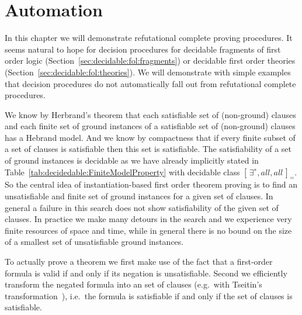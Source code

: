 
\chapter{Automation}



In this chapter we will demonstrate refutational complete proving procedures.
It seems natural to hope for decision procedures
for decidable fragments of first order logic
(Section~\ref{sec:decidable:fol:fragments})
or decidable first order theories (Section~\ref{sec:decidable:fol:theories}).
We will demonstrate with simple examples that decision procedures do not automatically
fall out from refutational complete procedures.


%
We know by Herbrand's theorem
that each satisfiable set of (non-ground) clauses
and each finite set of ground instances of a satisfiable set of (non-ground) clauses
has a Hebrand model.
And we know by compactness
that if every finite subset of a set of clauses is satisfiable then this set is satisfiable.
The satisfiability of a set of ground instances is decidable
as we have already implicitly stated in Table~\vref{tab:decidedable:FiniteModelProperty}
with decidable class \({[\,\exists^{∗}, all, all\,]}_{=}\).
So the central idea of instantiation-based first order theorem proving
is to find an unsatisfiable and finite set of ground instances for a given set of clauses.
In general a failure in this search does not show satisfiability of the given set of clauses.
In practice we make many detours in the search and we experience very finite resources of space and time,
while in general there is no bound on the size of a smallest set of unsatisfiable ground instances.



To actually prove a theorem
we first make use of the fact that a first-order formula is valid if and only if its negation is unsatisfiable.
Second we efficiently transform the negated formula into an {} set of clauses
(e.g.~with Tseitin's transformation~\cite{tseitin70}),
i.e.~the formula is satisfiable if and only if the set of clauses is satisfiable.

